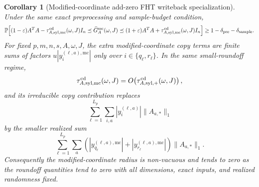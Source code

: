 \documentclass[11pt]{article}
\newcommand{\Prob}{\mathbb{P}}
\newcommand{\I}{I}
\newcommand{\eps}{\varepsilon}
\newtheorem{corollary}[theorem]{Corollary}
\theoremstyle{remark}
\begin{document}
\begin{corollary}[Modified-coordinate add-zero FHT writeback specialization]
Under the same exact preprocessing and sample-budget condition,
\[
  \Prob\!\left[
    (1-\eps)A^TA-\tau_{A,{\rm syl},{\rm mc}}^{\rm cd}(\omega,J)\I_n
    \preceq
    \widehat G_A^{\rm mc}(\omega,J)
    \preceq
    (1+\eps)A^TA+\tau_{A,{\rm syl},{\rm mc}}^{\rm cd}(\omega,J)\I_n
  \right]
  \ge
  1-\delta_{\rm pre}-\delta_{\rm sample}.
\]
For fixed \(p,m,n,s,A,\omega,J\), the extra modified-coordinate copy terms are
finite sums of factors \(u|y_i^{(\ell,a),\mathrm{mc}}|\) only over
\(i\in\{q_\ell,r_\ell\}\).  In the same small-roundoff regime,
\[
  \tau_{A,{\rm syl},{\rm mc}}^{\rm cd}(\omega,J)
  =
  O\!\left(
    \tau_{A,{\rm syl},+}^{\rm cd}(\omega,J)
  \right),
\]
and its irreducible copy contribution replaces
\[
  \sum_{\ell=1}^{L_p}\sum_{i,a}
    |y_i^{(\ell,a)}|\|A_{a,*}\|_1
\]
by the smaller realized sum
\[
  \sum_{\ell=1}^{L_p}\sum_{a}
    \left(
      |y_{q_\ell}^{(\ell,a),\mathrm{mc}}|
      +
      |y_{r_\ell}^{(\ell,a),\mathrm{mc}}|
    \right)\|A_{a,*}\|_1 .
\]
Consequently the modified-coordinate radius is non-vacuous and tends to zero
as the roundoff quantities tend to zero with all dimensions, exact inputs, and
realized randomness fixed.
\end{corollary}
\end{document}
